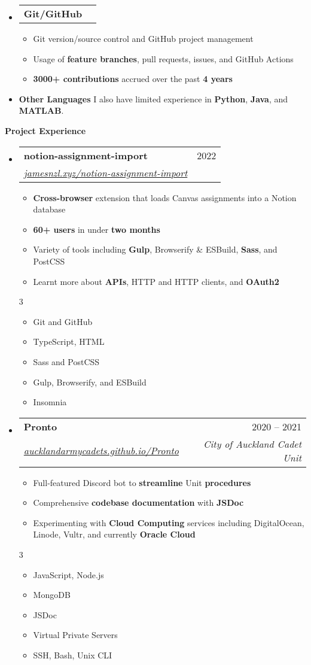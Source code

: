 \documentclass[11pt,a4paper]{article}[leftmargin=*]
\makeatletter
\def \entryspacing {-0pt}
\renewcommand{\section}[2]{\vspace{5pt}
  \colorbox{secondary}{\color{white}\raggedbottom\normalsize\textbf{{#1}{\hspace{7pt}#2}}}
}
\newcommand{\resumeEntryStart}{\begin{itemize}[leftmargin=2.5mm]}
\newcommand{\resumeEntryEnd}{\end{itemize}\vspace{\entryspacing}}
\newcommand{\resumeItemListStart}{\begin{itemize}[leftmargin=4.5mm]}
\newcommand{\resumeItemListEnd}{\end{itemize}}
\newcommand{\resumeItemListStartColumns}[2][-0.5]{\vspace*{#1\multicolsep}
\begin{multicols}{#2}\begin{itemize}[leftmargin=4.5mm]}
\newcommand{\resumeItemListEndColumns}[1][-0.5]{\end{itemize}\end{multicols}\vspace*{#1\multicolsep}}
\newcommand{\resumeItem}[1]{
  \item\small{
    {#1 \vspace{-2pt}}
  }
}
\newcommand{\resumeEntryTSDL}[4]{
  \vspace{-1pt}\item[]
    \begin{tabularx}{0.97\textwidth}{X@{\hspace{60pt}}r}
      \textbf{\color{primary}#1} & {\firabook\color{accent}\small#2} \\
      \textit{\color{accent}\small#3} & \textit{\color{accent}\small#4} \\
    \end{tabularx}\vspace{-6pt}
}
\newcommand{\resumeEntryTD}[2]{
  \vspace{-1pt}\item[]
    \begin{tabularx}{0.97\textwidth}{X@{\hspace{60pt}}r}
      \textbf{\color{primary}#1} & {\firabook\color{accent}\small#2} \\
    \end{tabularx}\vspace{-6pt}
}
\newcommand{\resumeEntryS}[2]{
  \item[]\small{
    \textbf{\color{primary}#1 }{ #2 \vspace{-4pt}}
  }
}
\newcommand{\resumeBf}[1]{\small\textbf{\color{halfbold}#1}}
\makeatother
\begin{document}
\resumeEntryStart
\resumeEntryTD
{Git/GitHub}{}
\resumeItemListStart
\resumeItem {Git version/source control and GitHub project management}
\resumeItem {Usage of \resumeBf{feature branches}, pull requests, issues, and GitHub Actions}
\resumeItem {\resumeBf{3000+ contributions} accrued over the past \resumeBf{4 years}}
\resumeItemListEnd
\resumeEntryEnd

\resumeEntryStart
\resumeEntryS
{Other Languages}{I also have limited experience in \resumeBf{Python}, \resumeBf{Java}, and \resumeBf{MATLAB}.}
\resumeEntryEnd

\pagebreak


\section{\faFlask}{Project Experience}

\resumeEntryStart
\resumeEntryTSDL
{notion-assignment-import}{2022}
{\href{https://jamesnzl.xyz/notion-assignment-import}{jamesnzl.xyz/notion-assignment-import}}{}
\resumeItemListStart
\resumeItem {\resumeBf{Cross-browser} extension that loads Canvas assignments into a Notion database}
\resumeItem {\resumeBf{60+ users} in under \resumeBf{two months}}
\resumeItem {Variety of tools including \resumeBf{Gulp}, Browserify \& ESBuild, \resumeBf{Sass}, and PostCSS}
\resumeItem {Learnt more about \resumeBf{APIs}, HTTP and HTTP clients, and \resumeBf{OAuth2}}
\resumeItemListEnd
\resumeItemListStartColumns{3}
\resumeItem {Git and GitHub}
\resumeItem {TypeScript, HTML}
\resumeItem {Sass and PostCSS}
\resumeItem {Gulp, Browserify, and ESBuild}
\resumeItem {Insomnia}
\resumeItemListEndColumns
\resumeEntryEnd

\resumeEntryStart
\resumeEntryTSDL
{Pronto}{2020 -- 2021}
{\href{https://aucklandarmycadets.github.io/Pronto/}{aucklandarmycadets.github.io/Pronto}}{City of Auckland Cadet Unit}
\resumeItemListStart
\resumeItem {Full-featured Discord bot to \resumeBf{streamline} Unit \resumeBf{procedures}}
\resumeItem {Comprehensive \resumeBf{codebase documentation} with \resumeBf{JSDoc}}
\resumeItem {Experimenting with \resumeBf{Cloud Computing} services including DigitalOcean, Linode, Vultr, and currently \resumeBf{Oracle Cloud}}
\resumeItemListEnd
\resumeItemListStartColumns{3}
\resumeItem {JavaScript, Node.js}
\resumeItem {MongoDB}
\resumeItem {JSDoc}
\resumeItem {Virtual Private Servers}
\resumeItem {SSH, Bash, Unix CLI}
\resumeItemListEndColumns
\resumeEntryEnd
\end{document}

